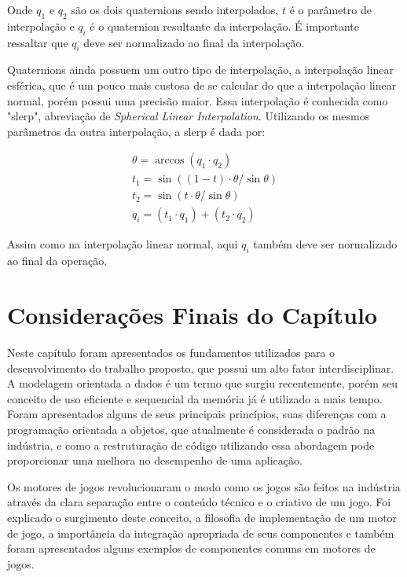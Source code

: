 \vspace{1cm}

Onde $q_1$ e $q_2$ são os dois quaternions sendo interpolados, $t$ é o parâmetro de 
interpolação e $q_i$ é o quaternion resultante da interpolação. É importante ressaltar 
que $q_i$ deve ser normalizado ao final da interpolação.

Quaternions ainda possuem um outro tipo de interpolação, a interpolação linear esférica, 
que é um pouco mais custosa de se calcular do que a interpolação linear normal, porém 
possui uma precisão maior. Essa interpolação é conhecida como "slerp", abreviação de 
\textit{Spherical Linear Interpolation}. Utilizando os mesmos parâmetros da outra 
interpolação, a slerp é dada por:

\begin{equation}
    \begin{aligned}
        \theta = \arccos(q_1 \cdotp q_2) \\
        t_1 = \sin((1 - t) \cdotp \theta / \sin \theta) \\
        t_2 = \sin(t \cdotp \theta / \sin \theta) \\
        q_i = (t_1 \cdotp q_1) + (t_2 \cdotp q_2)
    \end{aligned}
\end{equation}

\vspace{1cm}

Assim como na interpolação linear normal, aqui $q_i$ também deve ser normalizado ao final 
da operação.

\section{Considerações Finais do Capítulo}

Neste capítulo foram apresentados os fundamentos utilizados para o desenvolvimento do 
trabalho proposto, que possui um alto fator interdisciplinar.
A modelagem orientada a dados é um termo que surgiu recentemente, porém seu conceito de 
uso eficiente e sequencial da memória já é utilizado a mais tempo. Foram apresentados 
alguns de seus principais princípios, suas diferenças com a programação orientada a 
objetos, que atualmente é considerada o padrão na indústria, e como a restruturação de 
código utilizando essa abordagem pode proporcionar uma melhora no desempenho de uma 
aplicação.

Os motores de jogos revolucionaram o modo como os jogos são feitos na indústria através 
da clara separação entre o conteúdo técnico e o criativo de um jogo. Foi explicado o 
surgimento deste conceito, a filosofia de implementação de um motor de jogo, a 
importância da integração apropriada de seus componentes e também foram apresentados 
alguns exemplos de componentes comuns em motores de jogos.


